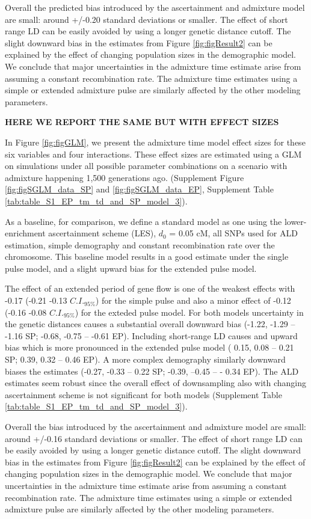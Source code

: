 \documentclass[11pt]{article}
\begin{document}
Overall the predicted bias introduced by the ascertainment and admixture model are small: around +/-0.20 standard deviations or smaller. The effect of short range LD can be easily avoided by using a longer genetic distance cutoff. The slight downward bias in the estimates from Figure \ref{fig:figResult2} can be explained by the effect of changing population sizes in the demographic model. We conclude that major uncertainties in the admixture time estimate arise from assuming a constant recombination rate. The admixture time estimates using a simple or extended admixture pulse are similarly affected by the other modeling parameters.

\textbf{HERE WE REPORT THE SAME BUT WITH EFFECT SIZES}

In Figure \ref{fig:figGLM}, we present the admixture time model effect sizes for these six variables and four interactions. These effect sizes are estimated using a GLM on simulations under all possible parameter combinations on a scenario with admixture happening 1,500 generations ago. (Supplement Figure \ref{fig:figSGLM_data_SP} and \ref{fig:figSGLM_data_EP}, Supplement Table \ref{tab:table_S1_EP_tm_td_and_SP_model_3}).

As a baseline, for comparison, we define a standard model as one using the lower-enrichment ascertainment scheme (LES), $d_{0}$ = 0.05 cM, all SNPs used for ALD estimation, simple demography and constant recombination rate over the chromosome. This baseline model results in a good estimate under the single pulse model, and a slight upward bias for the extended pulse model.

The effect of an extended period of gene flow is one of the weakest effects with -0.17 (-0.21 -0.13 $C.I._{95\%}$) for the simple pulse and also a minor effect of -0.12 (-0.16 -0.08 $C.I._{95\%}$) for the exteded pulse model. For both models uncertainty in the genetic distances causes a substantial overall downward bias (-1.22, -1.29 -- -1.16 SP; -0.68, -0.75 -- -0.61 EP). Including short-range LD causes and upward bias which is more pronounced in the extended pulse model ( 0.15, 0.08 -- 0.21 SP; 0.39, 0.32 -- 0.46 EP). A more complex demography similarly downward biases the estimates (-0.27, -0.33 -- 0.22 SP; -0.39, --0.45 -- - 0.34 EP). The ALD estimates seem robust since the overall effect of downsampling also with changing ascertainment scheme is not significant for both models (Supplement Table \ref{tab:table_S1_EP_tm_td_and_SP_model_3}).


Overall the bias introduced by the ascertainment and admixture model are small: around +/-0.16 standard deviations or smaller. The effect of short range LD can be easily avoided by using a longer genetic distance cutoff. The slight downward bias in the estimates from Figure \ref{fig:figResult2} can be explained by the effect of changing population sizes in the demographic model. We conclude that major uncertainties in the admixture time estimate arise from assuming a constant recombination rate. The admixture time estimates using a simple or extended admixture pulse are similarly affected by the other modeling parameters.
\end{document}
